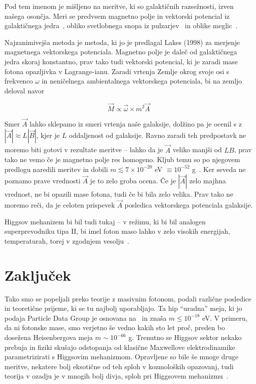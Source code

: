 \documentclass[a4paper, twocolumn, titlepage]{article}
\newcommand{\w}{
	\ensuremath{\omega}
}
\begin{document}
Pod tem imenom je mišljeno na meritve, ki so galaktičnih razsežnosti, izven našega osončja. Meri se predvsem magnetno polje in
vektorski potencial
iz galaktičnega jedra~\cite{over}, obliko svetlobnega snopa iz pulzarjev~\cite{nieto1} in oblike meglic~\cite{nieto2}.

Najzanimivejša metoda je metoda, ki jo je predlagal
Lakes (1998) za merjenje magnetnega vektorskega potenciala. Magnetno polje je daleč od galaktičnega jedra
skoraj konstantno, prav tako tudi vektorski potencial, ki je zaradi mase fotona opazljivka v Lagrange-ianu. Zaradi vrtenja Zemlje okrog
svoje osi s frekvenco $\w$ in neničelnega ambientalnega vektorskega potenciala, bi na zemljo deloval navor

\[
	\vec{M} \propto \vec{\w} \times m^2\vec{A}
\]

Smer $\vec{A}$ lahko sklepamo iz smeri vrtenja naše galaksije, dolžino pa je ocenil s z $|\vec{A}| \approx L|\vec{B}|$, kjer je $L$ oddaljenost
od galaksije. Ravno zaradi teh predpostavk ne moremo biti gotovi v rezultate meritve -- lahko da je $\vec{A}$ veliko manjši od $LB$, prav
tako ne vemo če je magnetno polje res homogeno. Kljub temu so po njegovem predlogu naredili meritev in dobili
$m \lesssim 7 \times 10^{-20}$ eV $\equiv 10^{-52}$ g~\cite{nieto2}. Ker seveda ne poznamo prave vrednosti $\vec{A}$ je to zelo groba ocena.
Če je $|\vec{A}|$ zelo majhna vrednost, ne bi opazili mase fotona, tudi če bi bila zelo velika. Prav tako ne moremo reči, da je celoten
prispevek $\vec{A}$ posledica vektorskega potenciala galaksije.

Higgsov mehanizem bi bil tudi tukaj -- v režimu, ki bi bil analogen superprevodniku tipa II, bi imel foton maso lahko v zelo visokih energijah,
temperaturah, torej v zgodnjem vesolju~\cite{nieto2}.

\section{Zaključek}

Tako smo se popeljali preko teorije z masivnim fotonom, podali različne posledice in teoretične prijeme, ki se tu najbolj uporabljajo. Ta hip
"`uradna"' meja, ki jo podaja {\sc Particle Data Group} je osnovana na~\cite{nieto2} in znaša $m \leq 10^{-18}$ eV. V primeru, da ni fotonske
mase, smo verjetno še vedno kakih sto let proč, preden bo dosežena Heisenbergova meja $m \sim 10^{-66}$ g. Trenutno se Higgsov sektor nekako
prebuja in fiziki skušajo odstopanja od klasične Maxwellove elektrodinamike parametrizirati s Higgsovim mehanizmom. Opravljene so bile še
mnoge druge meritve, nekatere bolj eksotične od teh sploh v kozmoloških opazovanj, tudi teorija v ozadju je v mnogih bolj divja, sploh pri
Higgsovem mehanizmu~\cite{higgs}.
\end{document}
